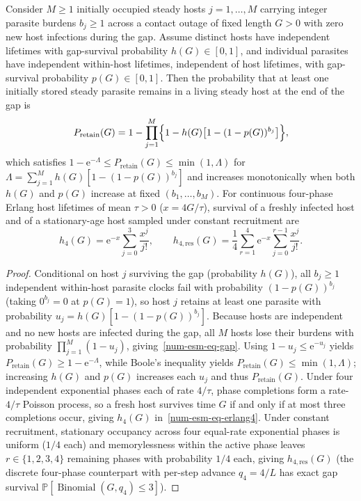 \begin{proposition}\label{num-esm-prop-gap}
Consider $M \ge 1$ initially occupied steady hosts $j = 1, \dots, M$ carrying integer parasite burdens $b_j \ge 1$ across a contact outage of fixed length $G > 0$ with zero new host infections during the gap. Assume distinct hosts have independent lifetimes with gap-survival probability $h(G) \in [0, 1]$, and individual parasites have independent within-host lifetimes, independent of host lifetimes, with gap-survival probability $p(G) \in [0, 1]$. Then the probability that at least one initially stored steady parasite remains in a living steady host at the end of the gap is
\begin{equation}\label{num-esm-eq-gap}
P_{\mathrm{retain}}(G) = 1 - \prod_{j=1}^{M}\Bigl\{1 - h(G)\bigl[1 - (1 - p(G))^{b_j}\bigr]\Bigr\},
\end{equation}
which satisfies $1 - \mathrm{e}^{-\Lambda} \le P_{\mathrm{retain}}(G) \le \min(1, \Lambda)$ for $\Lambda = \sum_{j=1}^M h(G)[1 - (1 - p(G))^{b_j}]$ and increases monotonically when both $h(G)$ and $p(G)$ increase at fixed $(b_1, \dots, b_M)$. For continuous four-phase Erlang host lifetimes of mean $\tau > 0$ ($x = 4G/\tau$), survival of a freshly infected host and of a stationary-age host sampled under constant recruitment are
\begin{equation}\label{num-esm-eq-erlang4}
h_4(G) = \mathrm{e}^{-x}\sum_{j=0}^{3}\frac{x^j}{j!}, \qquad h_{4,\mathrm{res}}(G) = \frac{1}{4}\sum_{r=1}^{4}\mathrm{e}^{-x}\sum_{j=0}^{r-1}\frac{x^j}{j!}.
\end{equation}
\end{proposition}

\begin{proof}
Conditional on host $j$ surviving the gap (probability $h(G)$), all $b_j \ge 1$ independent within-host parasite clocks fail with probability $(1 - p(G))^{b_j}$ (taking $0^{b_j} = 0$ at $p(G) = 1$), so host $j$ retains at least one parasite with probability $u_j = h(G)[1 - (1 - p(G))^{b_j}]$. Because hosts are independent and no new hosts are infected during the gap, all $M$ hosts lose their burdens with probability $\prod_{j=1}^M (1 - u_j)$, giving~\eqref{num-esm-eq-gap}. Using $1 - u_j \le \mathrm{e}^{-u_j}$ yields $P_{\mathrm{retain}}(G) \ge 1 - \mathrm{e}^{-\Lambda}$, while Boole's inequality yields $P_{\mathrm{retain}}(G) \le \min(1, \Lambda)$; increasing $h(G)$ and $p(G)$ increases each $u_j$ and thus $P_{\mathrm{retain}}(G)$. Under four independent exponential phases each of rate $4/\tau$, phase completions form a rate-$4/\tau$ Poisson process, so a fresh host survives time $G$ if and only if at most three completions occur, giving $h_4(G)$ in~\eqref{num-esm-eq-erlang4}. Under constant recruitment, stationary occupancy across four equal-rate exponential phases is uniform ($1/4$ each) and memorylessness within the active phase leaves $r \in \{1, 2, 3, 4\}$ remaining phases with probability $1/4$ each, giving $h_{4,\mathrm{res}}(G)$ (the discrete four-phase counterpart with per-step advance $q_4 = 4/L$ has exact gap survival $\mathbb{P}[\operatorname{Binomial}(G, q_4) \le 3]$).
\end{proof}

